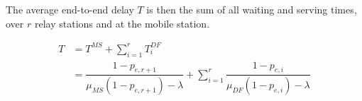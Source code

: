 The average end-to-end delay $T$ is then the sum of all waiting and serving times,
over $r$ relay stations and at the mobile station.

\begin{align*}
  T &= T^{MS} + \sum\limits_{i=1}^r T_i^{DF} \\
  ~ &= \dfrac{1 - p_{e,r+1}}{\mu_{MS}(1 - p_{e,r+1}) - \lambda} + \sum\limits_{i=1}^r \dfrac{1-p_{e,i}}{\mu_{DF} (1 - p_{e,i}) - \lambda}
\end{align*}

